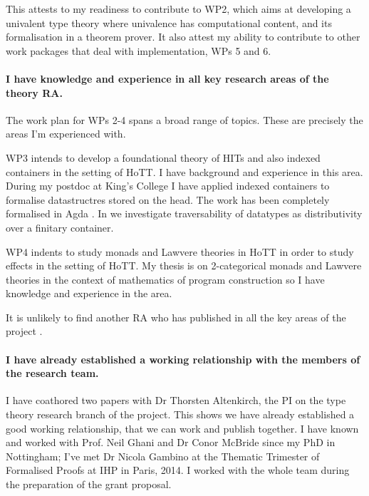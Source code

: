 \documentclass[a4paper]{article}
\begin{document}
This attests to my readiness to contribute to WP2, which aims at developing a univalent type theory where univalence has computational content, and its formalisation in a theorem prover. It also attest my ability to contribute to other work packages that deal with implementation, WPs 5 and 6. 


\paragraph{I have knowledge and experience in all key research areas of the theory RA.} 
The work plan for WPs 2-4 spans a broad range of topics. These are precisely the areas I'm experienced with. 

WP3 intends to develop a foundational theory of HITs and also indexed containers in the setting of HoTT. I have background and experience in this area.  During my postdoc at King's College I have applied indexed containers to formalise datastructres stored on the head. The work has been completely formalised in Agda .  In  we investigate traversability of datatypes as distributivity over a finitary container.

WP4 indents to study monads and Lawvere theories in HoTT in order to study effects in the setting of HoTT.  My thesis  is on 2-categorical monads and Lawvere theories in the context of mathematics of program construction so I have knowledge and experience in the area. 


It is unlikely to find another RA who has published in all the key areas of the project . 


\paragraph{I have already established a working relationship with the members of the research team.} I have coathored two papers with Dr Thorsten Altenkirch, the PI on the type theory research branch of the project. This shows we have already established a good working relationship, that we can work and publish together. I have known and worked with Prof. Neil Ghani and Dr Conor McBride since my PhD in Nottingham; I've met Dr Nicola Gambino at the Thematic Trimester of Formalised Proofs at IHP in Paris, 2014. I worked with the whole team during the preparation of the grant proposal. 
\end{document}
